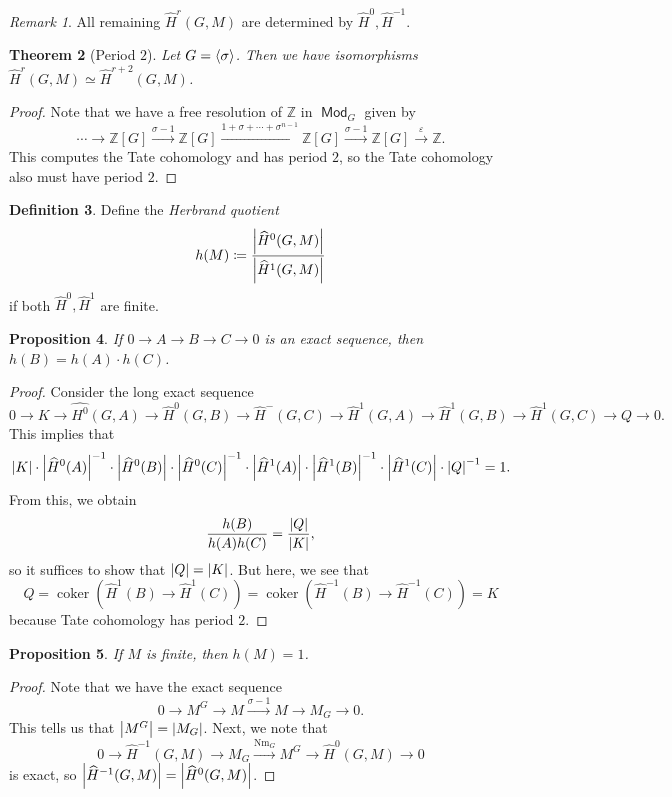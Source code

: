 \documentclass[leqno, openany]{memoir}
\newtheorem{thm}{Theorem}[section]
\newtheorem{prop}[thm]{Proposition}
\theoremstyle{definition}
\newtheorem{defn}[thm]{Definition}
\theoremstyle{remark}
\newtheorem{rmk}[thm]{Remark}
\theoremstyle{plain}
\theoremstyle{definition}
\theoremstyle{remark}
\newcommand{\Z}{\mathbb{Z}}
\newcommand{\ep}{\varepsilon}
\newcommand{\wh}[1]{\widehat{#1}}
\DeclareMathOperator{\Mod}{\mathsf{Mod}}
\DeclareMathOperator{\Nm}{Nm}
\DeclareMathOperator{\coker}{coker}
\begin{document}
\begin{rmk}
    All remaining $\wh{H}^r(G, M)$ are determined by $\wh{H}^0, \wh{H}^{-1}$.
\end{rmk}

\begin{thm}[Period $2$]
    Let $G = \ev{\sigma}$. Then we have isomorphisms $\wh{H}^r(G, M) \simeq \wh{H}^{r+2}(G, M)$.
\end{thm}

\begin{proof}
    Note that we have a free resolution of $\Z$ in $\Mod_G$ given by
    \[ \cdots \to \Z[G] \xrightarrow{\sigma - 1} \Z[G] \xrightarrow{1 + \sigma + \cdots + \sigma^{n-1}} \Z[G] \xrightarrow{\sigma - 1} \Z[G] \xrightarrow{\ep} \Z. \]
    This computes the Tate cohomology and has period $2$, so the Tate cohomology also must have period $2$.
\end{proof}

\begin{defn}
    Define the \textit{Herbrand quotient} 
    \[ h(M) \coloneqq \frac{\abs{\wh{H}^0(G, M)}}{\abs{\wh{H}^1(G, M)}} \]
    if both $\wh{H}^0, \wh{H}^1$ are finite.
\end{defn}

\begin{prop}
    If $0 \to A \to B \to C \to 0$ is an exact sequence, then $h(B) = h(A) \cdot h(C)$.
\end{prop}

\begin{proof}
    Consider the long exact sequence
    \[ 0 \to K \to \wh{H^0}(G, A) \to \wh{H}^0(G, B) \to \wh{H}^-(G, C) \to \wh{H}^1(G, A) \to \wh{H}^1(G, B) \to \wh{H}^1(G, C) \to Q \to 0. \]
    This implies that 
    \[ \abs{K} \cdot \abs{\wh{H}^0(A)}^{-1} \cdot \abs{\wh{H}^0(B)} \cdot \abs{\wh{H}^0(C)}^{-1} \cdot \abs{\wh{H}^1(A)} \cdot \abs{\wh{H}^1(B)}^{-1} \cdot \abs{\wh{H}^1(C)} \cdot \abs{Q}^{-1} = 1. \]
    From this, we obtain
    \[ \frac{h(B)}{h(A)h(C)} = \frac{\abs{Q}}{\abs{K}}, \]
    so it suffices to show that $\abs{Q} = \abs{K}$. But here, we see that
    \[ Q = \coker (\wh{H}^1(B) \to \wh{H}^1(C)) = \coker (\wh{H}^{-1}(B) \to \wh{H}^{-1}(C)) = K \]
    because Tate cohomology has period $2$.
\end{proof}

\begin{prop}
    If $M$ is finite, then $h(M) = 1$.
\end{prop}

\begin{proof}
    Note that we have the exact sequence
    \[ 0 \to M^G \to M \xrightarrow{\sigma - 1} M \to M_G \to 0. \]
    This tells us that $\abs{M^G} = \abs{M_G}$. Next, we note that
    \[ 0 \to \wh{H}^{-1}(G, M) \to M_G \xrightarrow{\Nm_G} M^G \to \wh{H}^0(G, M) \to 0 \]
    is exact, so $\abs{\wh{H}^{-1}(G, M)} = \abs{\wh{H}^0(G, M)}$.
\end{proof}
\end{document}
